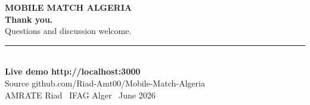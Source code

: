 \documentclass[aspectratio=169,11pt]{beamer}
\begin{document}
{
\begin{frame}[plain]
  \vfill
  \begin{flushleft}\hspace{0.6cm}%
  {\color{accentdk}\bfseries\footnotesize MOBILE MATCH ALGERIA}\\[8pt]
  {\color{ink}\fontsize{46}{50}\selectfont\bfseries Thank you.}\\[8pt]
  {\color{sec}\Large Questions and discussion welcome.}\\[10pt]
  {\color{accent}\rule{1.2cm}{2.5pt}}\\[10pt]
  {\color{ink}\small\bfseries Live demo\;\; http://localhost:3000}\\[3pt]
  {\color{sec}\small Source\;\; github.com/Riad-Amt00/Mobile-Match-Algeria}\\[8pt]
  {\color{muted}\footnotesize AMRATE Riad \textbullet\ IFAG Alger \textbullet\ June 2026}
  \end{flushleft}
  \vfill
\end{frame}}
\end{document}
